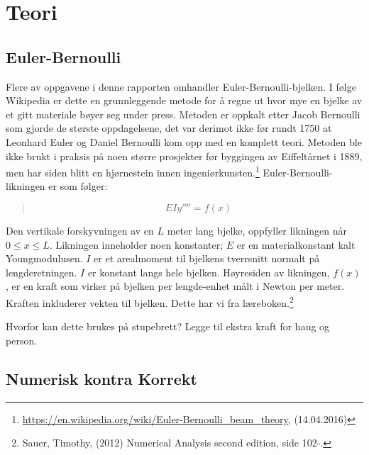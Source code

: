 \section{Teori}

\subsection{Euler-Bernoulli}
Flere av oppgavene i denne rapporten omhandler Euler-Bernoulli-bjelken. I følge Wikipedia er dette en grunnleggende metode for å regne ut hvor mye en bjelke av et gitt materiale bøyer seg under press. Metoden er oppkalt etter Jacob Bernoulli som gjorde de største oppdagelsene, det var derimot ikke før rundt 1750 at Leonhard Euler og Daniel Bernoulli kom opp med en komplett teori. Metoden ble ikke brukt i praksis på noen større prosjekter før byggingen av Eiffeltårnet i 1889, men har siden blitt en hjørnestein innen ingeniørkunsten.\footnote{\url{https://en.wikipedia.org/wiki/Euler-Bernoulli_beam_theory}, (14.04.2016)} Euler-Bernoulli-likningen er som følger:
\begin{quote}
\begin{equation}
EIy''''=f(x)
\end{equation}
\end{quote}
Den vertikale forskyvningen av en $L$ meter lang bjelke, oppfyller likningen når $0\leq x\leq L$. Likningen inneholder noen konstanter; $E$ er en materialkonstant kalt Youngmodulusen. $I$ er et arealmoment til bjelkens tverrsnitt normalt på lengderetningen. $I$ er konstant langs hele bjelken. Høyresiden av likningen, $f(x)$, er en kraft som virker på bjelken per lengde-enhet målt i Newton per meter. Kraften inkluderer vekten til bjelken. Dette har vi fra læreboken.\footnote{Sauer, Timothy, (2012) Numerical Analysis second edition, side 102-.}

Hvorfor kan dette brukes på stupebrett?
Legge til ekstra kraft for haug og person.

\subsection{Numerisk kontra Korrekt}

